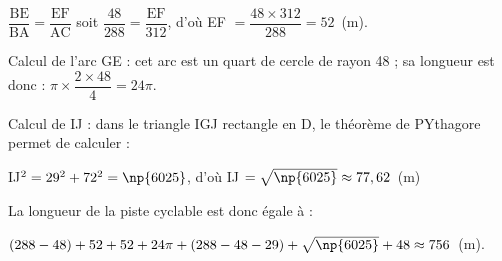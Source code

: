 \documentclass[10pt]{article}
\begin{document}
$\dfrac{\text{BE}}{\text{BA}} =  \dfrac{\text{EF}}{\text{AC}}$ soit $\dfrac{48}{288} =  \dfrac{\text{EF}}{312}$, d'où EF $ = \dfrac{48 \times 312}{288} = 52$~(m).

Calcul de l'arc GE : cet arc est un quart de cercle de rayon 48 ; sa longueur est donc : $\pi \times \dfrac{2\times 48}{4} = 24\pi$.

Calcul de IJ : dans le triangle IGJ rectangle en D, le théorème de PYthagore permet de calculer :

IJ$^2 = 29^2 + 72^2 = \np{6025}$, d'où IJ $ = \sqrt{\np{6025}} \approx 77,62$~(m)

La longueur de la piste cyclable est donc égale à :

$(288 - 48) + 52 + 52 + 24\pi + (288 - 48 - 29) + \sqrt{\np{6025}} + 48 \approx 756$~(m).
\end{document}

